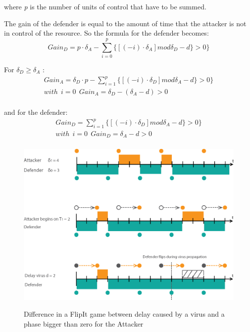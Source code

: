 where \textit{p} is the number of units of control that have to be summed.  

The gain of the defender is equal to the amount of time that the attacker is not in control of the resource. So the formula for the defender becomes:
\begin{equation}\label{first}
Gain_{D} = p \cdot \delta_{A}  -  \sum_{i=0}^{p} \lbrace [( - i ) \cdot \delta_{A}] mod \delta_{D} - d \rbrace  > 0 \rbrace 
\end{equation}

For $\delta_{D} \geq \delta_{A}$ :
\begin{subequations}\label{grp}
\begin{align}
Gain_{A} =\delta_{D} \cdot p - \sum_{i=1}^{p} \lbrace [( - i ) \cdot \delta_{D}] mod \delta_{A} -d \rbrace > 0 \rbrace \\
with~~ i=0 ~~ Gain_{A}=\delta_{D} -( \delta_{A} - d) > 0\\ 
\end{align}
\end{subequations}

and for the defender:
\begin{subequations}\label{grp}
\begin{align}
Gain_{D} =\sum_{i=1}^{p} \lbrace [( - i ) \cdot \delta_{D}] mod \delta_{A} - d \rbrace > 0  \rbrace \\
with~~ i=0 ~~ Gain_{D}=\delta_{A} - d > 0\\ 
\end{align}
\end{subequations}



\begin{figure}[hbtp]
\caption{Difference in a FlipIt game between delay caused by a virus and a phase bigger than zero for the Attacker}
\centering
\includegraphics[scale=1]{Images/Flipvirus}
\label{fig:virusflip}
\end{figure}


